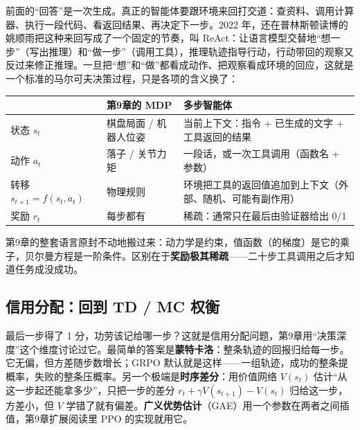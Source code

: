 前面的“回答”是一次生成。真正的智能体要跟环境来回打交道：查资料、调用计算器、执行一段代码、看返回结果、再决定下一步。2022 年，还在普林斯顿读博的姚顺雨把这种来回写成了一个固定的节奏，叫 ReAct：让语言模型交替地“想一步”（写出推理）和“做一步”（调用工具），推理轨迹指导行动，行动带回的观察又反过来修正推理。一旦把“想”和“做”都看成动作、把观察看成环境的回应，这就是一个标准的马尔可夫决策过程，只是各项的含义换了：
\begin{center}
\renewcommand{\arraystretch}{1.3}
\small
\begin{tabular}{@{}p{3.0cm}p{2.8cm}p{6.1cm}@{}}
\toprule
& \textbf{第9章的 MDP} & \textbf{多步智能体} \\
\midrule
状态 $s_t$ & 棋盘局面 / 机器人位姿 & 当前上下文：指令 + 已生成的文字 + 工具返回的结果 \\
动作 $a_t$ & 落子 / 关节力矩 & 一段话，或一次工具调用（函数名 + 参数） \\
转移 $s_{t+1} = f(s_t, a_t)$ & 物理规则 & 环境把工具的返回值追加到上下文（外部、随机、可能有副作用） \\
奖励 $r_t$ & 每步都有 & 稀疏：通常只在最后由验证器给出 0/1 \\
\bottomrule
\end{tabular}
\end{center}
第9章的整套语言原封不动地搬过来：动力学是约束，值函数（的梯度）是它的乘子，贝尔曼方程是一阶条件。区别在于\textbf{奖励极其稀疏}——二十步工具调用之后才知道任务成没成功。

\subsection{信用分配：回到 TD / MC 权衡}

最后一步得了 1 分，功劳该记给哪一步？这就是信用分配问题，第9章用“决策深度”这个维度讨论过它。最简单的答案是\textbf{蒙特卡洛}：整条轨迹的回报归给每一步。它无偏，但方差随步数增长；GRPO 默认就是这样——一组轨迹，成功的整条提概率，失败的整条压概率。另一个极端是\textbf{时序差分}：用价值网络 $V(s_t)$ 估计“从这一步起还能拿多少”，只把一步的差分 $r_t + \gamma V(s_{t+1}) - V(s_t)$ 归给这一步，方差小，但 $V$ 学错了就有偏差。\textbf{广义优势估计}（GAE）用一个参数在两者之间插值，第9章扩展阅读里 PPO 的实现就用它。

